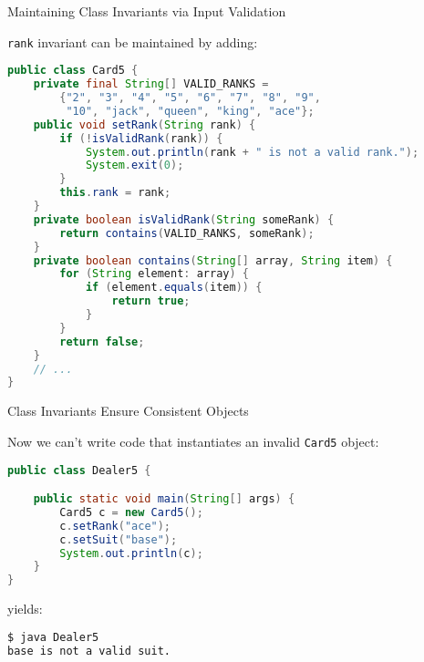 \documentclass{beamer}
\begin{document}
\begin{frame}[fragile]{Maintaining Class Invariants via Input Validation}


\vspace{-.05in}
{\tt rank} invariant can be maintained by adding:
\vspace{-.05in}
\begin{lstlisting}[language=Java]
public class Card5 {
    private final String[] VALID_RANKS =
        {"2", "3", "4", "5", "6", "7", "8", "9",
         "10", "jack", "queen", "king", "ace"};
    public void setRank(String rank) {
        if (!isValidRank(rank)) {
            System.out.println(rank + " is not a valid rank.");
            System.exit(0);
        }
        this.rank = rank;
    }
    private boolean isValidRank(String someRank) {
        return contains(VALID_RANKS, someRank);
    }
    private boolean contains(String[] array, String item) {
        for (String element: array) {
            if (element.equals(item)) {
                return true;
            }
        }
        return false;
    }
    // ...
}
\end{lstlisting}

\end{frame}

\begin{frame}[fragile]{Class Invariants Ensure Consistent Objects}


Now we can't write code that instantiates an invalid {\tt Card5} object:
\begin{lstlisting}[language=Java]
public class Dealer5 {

    public static void main(String[] args) {
        Card5 c = new Card5();
        c.setRank("ace");
        c.setSuit("base");
        System.out.println(c);
    }
}
\end{lstlisting}
yields:
\begin{lstlisting}[language=bash]
$ java Dealer5
base is not a valid suit.
\end{lstlisting}

\end{frame}
\end{document}
